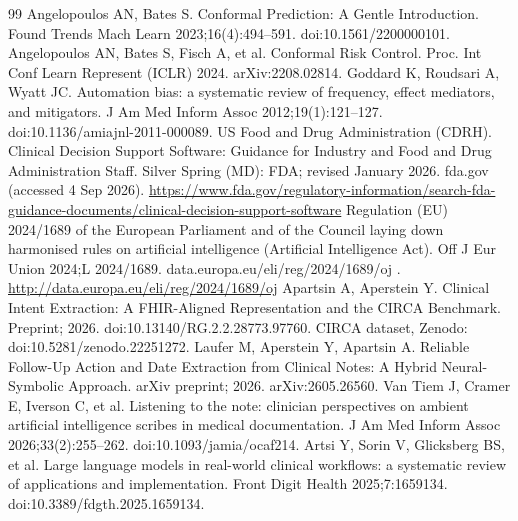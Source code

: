\documentclass[3p,twocolumn]{elsarticle}
\begin{document}
\begin{thebibliography}{99}
\label{r65} Angelopoulos AN, Bates S. Conformal Prediction: A Gentle Introduction. Found Trends Mach Learn 2023;16(4):494--591. doi:10.1561/2200000101.
\label{r66} Angelopoulos AN, Bates S, Fisch A, et al. Conformal Risk Control. Proc. Int Conf Learn Represent (ICLR) 2024. arXiv:2208.02814.
\label{r67} Goddard K, Roudsari A, Wyatt JC. Automation bias: a systematic review of frequency, effect mediators, and mitigators. J Am Med Inform Assoc 2012;19(1):121--127. doi:10.1136/amiajnl-2011-000089.
\label{r68} US Food and Drug Administration (CDRH). Clinical Decision Support Software: Guidance for Industry and Food and Drug Administration Staff. Silver Spring (MD): FDA; revised January 2026. fda.gov (accessed 4 Sep 2026). \url{https://www.fda.gov/regulatory-information/search-fda-guidance-documents/clinical-decision-support-software}
\label{r69} Regulation (EU) 2024/1689 of the European Parliament and of the Council laying down harmonised rules on artificial intelligence (Artificial Intelligence Act). Off J Eur Union 2024;L 2024/1689. data.europa.eu/eli/reg/2024/1689/oj . \url{http://data.europa.eu/eli/reg/2024/1689/oj}
\label{r70} Apartsin A, Aperstein Y. Clinical Intent Extraction: A FHIR-Aligned Representation and the CIRCA Benchmark. Preprint; 2026. doi:10.13140/RG.2.2.28773.97760. CIRCA dataset, Zenodo: doi:10.5281/zenodo.22251272.
\label{r71} Laufer M, Aperstein Y, Apartsin A. Reliable Follow-Up Action and Date Extraction from Clinical Notes: A Hybrid Neural-Symbolic Approach. arXiv preprint; 2026. arXiv:2605.26560.
\label{r72} Van Tiem J, Cramer E, Iverson C, et al. Listening to the note: clinician perspectives on ambient artificial intelligence scribes in medical documentation. J Am Med Inform Assoc 2026;33(2):255--262. doi:10.1093/jamia/ocaf214.
\label{r73} Artsi Y, Sorin V, Glicksberg BS, et al. Large language models in real-world clinical workflows: a systematic review of applications and implementation. Front Digit Health 2025;7:1659134. doi:10.3389/fdgth.2025.1659134.
\end{thebibliography}
\end{document}
